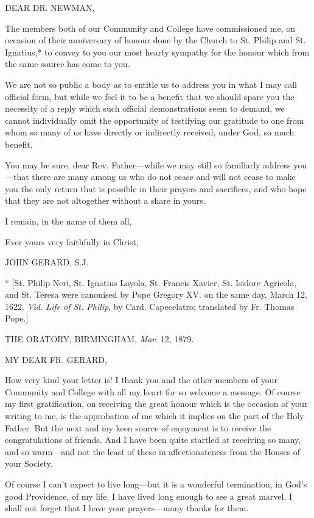 DEAR DR. NEWMAN,

The members both of our Community and College have commissioned me, on
occasion of their anniversary of honour done by the Church to St.
Philip and St. Ignatius,* to convey to you our most hearty sympathy
for the honour which from the same source has come to you.

We are not so public a body as to entitle us to address you in what
I may call official form, but while we feel it to be a benefit that we
should spare you the necessity of a reply which such official
demonstrations seem to demand, we cannot individually omit the
opportunity of testifying our gratitude to one from whom so many of us
have directly or indirectly received, under God, so much benefit.

You may be sure, dear Rev. Father—while we may still so
familiarly address you—that there are many among us who do not cease
and will not cease to make you the only return that is possible in
their prayers and sacrifices, and who hope that they are not
altogether without a share in yours.

I remain, in the name of them all,

Ever yours very faithfully in Christ,

JOHN GERARD, S.J.

* [St. Philip Neri, St. Ignatius Loyola, St. Francis
Xavier, St. Isidore Agricola, and St. Teresa were canonised by Pope
Gregory XV. on the same day, March 12, 1622. \emph{Vid. Life of St.
Philip}, by Card. Capecelatro; translated by Fr. Thomas Pope.]


THE ORATORY, BIRMINGHAM,
\emph{Mar}. 12, 1879.

MY DEAR FR.
GERARD,

How very kind your letter is! I thank you and the other members of
your Community and College with all my heart for so welcome a message.
Of course my first gratification, on receiving the great honour which
is the occasion of your writing to me, is the approbation of me which
it implies on the part of the Holy Father. But the next and my keen
source of enjoyment is to receive the congratulations of friends. And
I have been quite startled at receiving so many, and so warm—and not
the least of these in affectionateness from the Houses of your
Society.

Of course I can't expect to live long—but it is a wonderful
termination, in God's good Providence, of my life. I have lived long
enough to see a great marvel. I shall not forget that I have your
prayers—many thanks for them.

